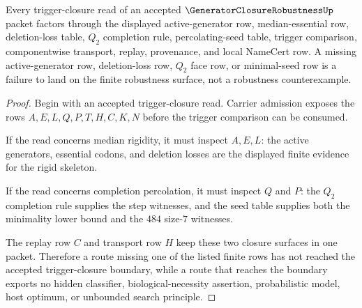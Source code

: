 \begin{theorem}
\label{thm:generator-closure-robustness-trigger-closure-boundary}
Every trigger-closure read of an accepted $\GeneratorClosureRobustnessUp$ packet factors through the displayed active-generator row, median-essential row, deletion-loss table, $Q_{2}$ completion rule, percolating-seed table, trigger comparison, componentwise transport, replay, provenance, and local NameCert row. A missing active-generator row, deletion-loss row, $Q_{2}$ face row, or minimal-seed row is a failure to land on the finite robustness surface, not a robustness counterexample.
\end{theorem}
\begin{proof}
Begin with an accepted trigger-closure read. Carrier admission exposes the rows $A,E,L,Q,P,T,H,C,K,N$ before the trigger comparison can be consumed.

If the read concerns median rigidity, it must inspect $A,E,L$: the active generators, essential codons, and deletion losses are the displayed finite evidence for the rigid skeleton.

If the read concerns completion percolation, it must inspect $Q$ and $P$: the $Q_{2}$ completion rule supplies the step witnesses, and the seed table supplies both the minimality lower bound and the $484$ size-$7$ witnesses.

The replay row $C$ and transport row $H$ keep these two closure surfaces in one packet. Therefore a route missing one of the listed finite rows has not reached the accepted trigger-closure boundary, while a route that reaches the boundary exports no hidden classifier, biological-necessity assertion, probabilistic model, host optimum, or unbounded search principle.
\end{proof}



